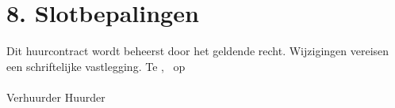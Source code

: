 \section*{8. Slotbepalingen}
Dit huurcontract wordt beheerst door het geldende recht. Wijzigingen vereisen een schriftelijke vastlegging.
\vspace{2cm}
Te \ContractPlace, \ op \ContractDate \hfill \underline{\hspace{5cm}} \\ \vspace{1.5cm}
\underline{\hspace{5cm}} \hfill \underline{\hspace{5cm}} \\ \vspace{0.2cm} Verhuurder \hfill Huurder \\
